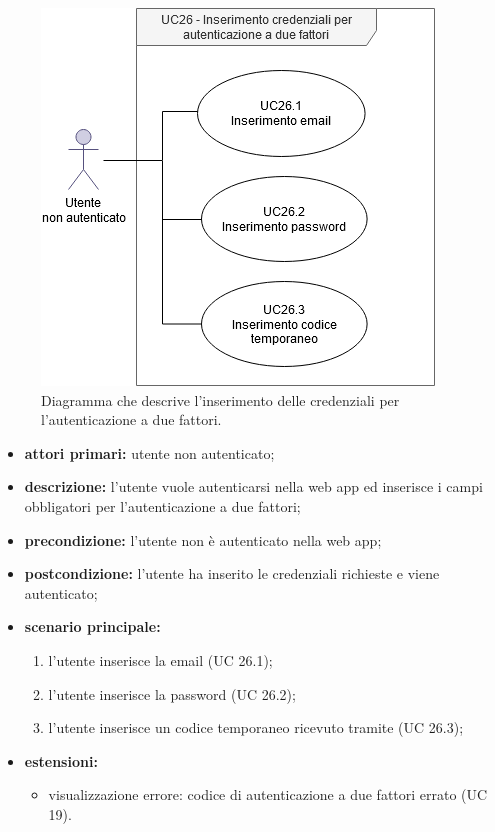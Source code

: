 		\begin{figure}[H]
			\centering
			\includegraphics[scale=0.675]{res/images/uc26}
			\caption{Diagramma che descrive l'inserimento delle credenziali per l'autenticazione a due fattori.}
		\end{figure}
		
		\begin{itemize}
			\item \textbf{attori primari:} utente non autenticato;
			\item \textbf{descrizione:} l'utente vuole autenticarsi nella web app ed inserisce i campi obbligatori per l'autenticazione a due fattori;
			\item \textbf{precondizione:} l'utente non è autenticato nella web app;
			\item \textbf{postcondizione:} l'utente ha inserito le credenziali richieste e viene autenticato;
			\item \textbf{scenario principale:}
			\begin{enumerate}
				\item l'utente inserisce la email (UC 26.1);
				\item l'utente inserisce la password (UC 26.2);
				\item l'utente inserisce un codice temporaneo ricevuto tramite  (UC 26.3);
			\end{enumerate}
			\item \textbf{estensioni:}
			\begin{itemize}
				\item visualizzazione errore: codice di autenticazione a due fattori errato (UC 19).
			\end{itemize}
		\end{itemize}
		

